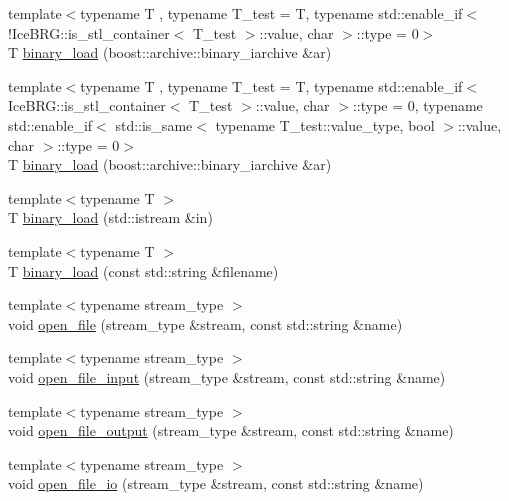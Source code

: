 \begin{DoxyCompactItemize}
\item 
{\footnotesize template$<$typename T , typename T\+\_\+test  = T, typename std\+::enable\+\_\+if$<$!\+Ice\+B\+R\+G\+::is\+\_\+stl\+\_\+container$<$ T\+\_\+test $>$\+::value, char $>$\+::type  = 0$>$ }\\T \hyperlink{namespaceIceBRG_a549b45e1c2a20ce0d322078b362703f6}{binary\+\_\+load} (boost\+::archive\+::binary\+\_\+iarchive \&ar)
\item 
{\footnotesize template$<$typename T , typename T\+\_\+test  = T, typename std\+::enable\+\_\+if$<$ Ice\+B\+R\+G\+::is\+\_\+stl\+\_\+container$<$ T\+\_\+test $>$\+::value, char $>$\+::type  = 0, typename std\+::enable\+\_\+if$<$ std\+::is\+\_\+same$<$ typename T\+\_\+test\+::value\+\_\+type, bool $>$\+::value, char $>$\+::type  = 0$>$ }\\T \hyperlink{namespaceIceBRG_ab7ff0ea3712ba0c10f1bb6c53ce5cf38}{binary\+\_\+load} (boost\+::archive\+::binary\+\_\+iarchive \&ar)
\item 
{\footnotesize template$<$typename T $>$ }\\T \hyperlink{namespaceIceBRG_a1b7650b6041017d3000f92c16bbe1624}{binary\+\_\+load} (std\+::istream \&in)
\item 
{\footnotesize template$<$typename T $>$ }\\T \hyperlink{namespaceIceBRG_a62821f1be451ec92aa181b8a1780fb57}{binary\+\_\+load} (const std\+::string \&filename)
\item 
{\footnotesize template$<$typename stream\+\_\+type $>$ }\\void \hyperlink{namespaceIceBRG_a5b4ac3464869824e71dfa81466ec2928}{open\+\_\+file} (stream\+\_\+type \&stream, const std\+::string \&name)
\item 
{\footnotesize template$<$typename stream\+\_\+type $>$ }\\void \hyperlink{namespaceIceBRG_a6efe96f7b5966041c9a2340e7b905a0e}{open\+\_\+file\+\_\+input} (stream\+\_\+type \&stream, const std\+::string \&name)
\item 
{\footnotesize template$<$typename stream\+\_\+type $>$ }\\void \hyperlink{namespaceIceBRG_a449b2c7b749810a767c3debbcfc3f623}{open\+\_\+file\+\_\+output} (stream\+\_\+type \&stream, const std\+::string \&name)
\item 
{\footnotesize template$<$typename stream\+\_\+type $>$ }\\void \hyperlink{namespaceIceBRG_a04052c6797231d6de214b714a9cc91de}{open\+\_\+file\+\_\+io} (stream\+\_\+type \&stream, const std\+::string \&name)

\end{DoxyCompactItemize}
